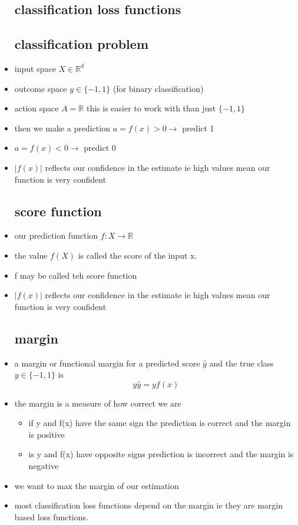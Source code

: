 \documentclass{article}
\begin{document}
\begin{itemize}
 \subsection{classification loss functions }
\subsection{classification problem}
\item input space $X\in \mathbb{R}^{d}$
\item outcome space $y\in \{-1,1\}$ (for binary classification)
\item action space $A=\mathbb{R}$ this is easier to work with than just $\{-1,1\}$
\item then we make a prediction $a=f(x)>0\rightarrow $ predict 1 
\item $a=f(x)<0\rightarrow $ predict 0
\item $|f(x)|$ reflects our confidence in the estimate ie high values mean our function is very confident 
\subsection{score function}
\item our prediction function  $f:X\rightarrow \mathbb{R}$
\item the value $f(X)$ is called the score of the input x. 
\item f may be called teh score function 
\item $|f(x)|$ reflects our confidence in the estimate ie high values mean our function is very confident
\subsection{margin}
\item a margin or functional margin for a predicted score $\hat{y}$ and the true class $y\in \{-1,1\}$ is $$y\hat{y}=yf(x)$$
\item the margin is a measure of how correct we are 
\begin{itemize}
    \item if y and f(x) have the same sign the prediction is correct and the margin is positive
    \item is y and f(x) have opposite signs prediction is incorrect and the margin is negative
\end{itemize}
\item we want to max the margin of our estimation
\item most classification loss functions depend on the margin ie they are margin based loss functions. 

\end{itemize}
\end{document}
